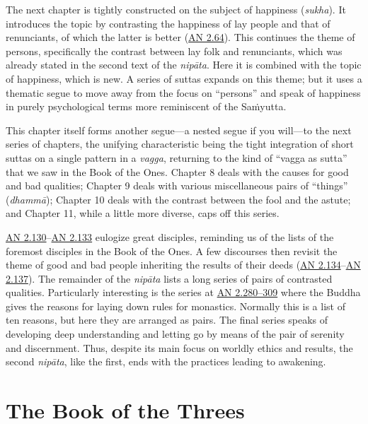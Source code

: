 \documentclass[12pt,openany]{book}%
\begin{document}
The next chapter is tightly constructed on the subject of happiness (\textit{sukha}). It introduces the topic by contrasting the happiness of lay people and that of renunciants, of which the latter is better (\href{https://suttacentral.net/an2.64{-}76}{AN 2.64}). This continues the theme of persons, specifically the contrast between lay folk and renunciants, which was already stated in the second text of the \textit{\textsanskrit{nipāta}}. Here it is combined with the topic of happiness, which is new. A series of suttas expands on this theme; but it uses a thematic segue to move away from the focus on “persons” and speak of happiness in purely psychological terms more reminiscent of the \textsanskrit{Saṁyutta}.

This chapter itself forms another segue—a nested segue if you will—to the next series of chapters, the unifying characteristic being the tight integration of short suttas on a single pattern in a \textit{vagga}, returning to the kind of “vagga as sutta” that we saw in the Book of the Ones. Chapter 8 deals with the causes for good and bad qualities; Chapter 9 deals with various miscellaneous pairs of “things” (\textit{\textsanskrit{dhammā}}); Chapter 10 deals with the contrast between the fool and the astute; and Chapter 11, while a little more diverse, caps off this series.

\href{https://suttacentral.net/an2.130{-}140}{AN 2.130}–\href{https://suttacentral.net/an2.130{-}140}{AN 2.133} eulogize great disciples, reminding us of the lists of the foremost disciples in the Book of the Ones. A few discourses then revisit the theme of good and bad people inheriting the results of their deeds (\href{https://suttacentral.net/an2.130{-}140}{AN 2.134}–\href{https://suttacentral.net/an2.130{-}140}{AN 2.137}). The remainder of the \textit{\textsanskrit{nipāta}} lists a long series of pairs of contrasted qualities. Particularly interesting is the series at \href{https://suttacentral.net/an2.280{-}309}{AN 2.280–309} where the Buddha gives the reasons for laying down rules for monastics. Normally this is a list of ten reasons, but here they are arranged as pairs. The final series speaks of developing deep understanding and letting go by means of the pair of serenity and discernment. Thus, despite its main focus on worldly ethics and results, the second \textit{\textsanskrit{nipāta}}, like the first, ends with the practices leading to awakening.

\section*{The Book of the Threes}
\end{document}
